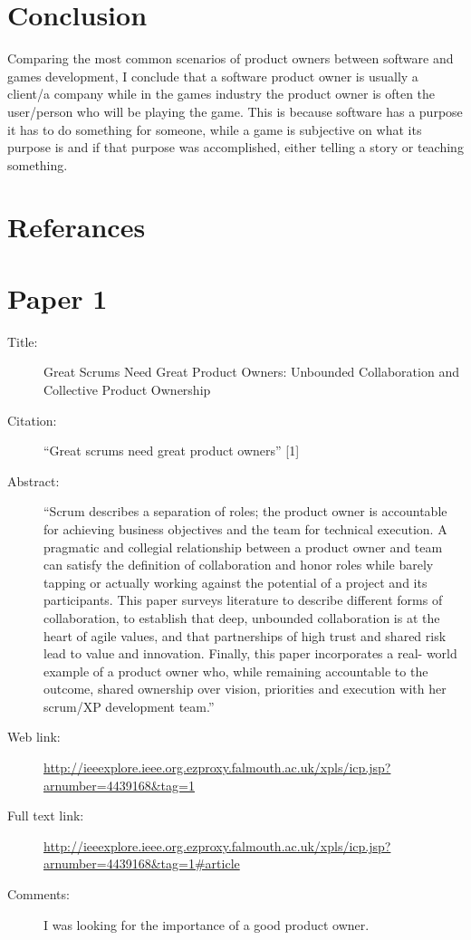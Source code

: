 \documentclass{scrartcl}
\begin{document}
\section{Conclusion}

Comparing the most common scenarios of product owners between software and games development, I conclude that a software product owner is usually a client/a company while in the games industry the product owner is often the user/person who will be playing the game. This is because software has a purpose it has to do something for someone, while a game is subjective on what its purpose is and if that purpose was accomplished, either telling a story or teaching something.






\section{Referances}
\section*{Paper 1}

\begin{description}
\item[Title:] Great Scrums Need Great Product Owners: Unbounded Collaboration  and Collective Product Ownership
\item[Citation:] “Great scrums need great product owners” [1]
\item[Abstract:] ``Scrum describes a separation of roles; the product owner is accountable for achieving business objectives and the team for technical execution. A pragmatic and collegial relationship between a product owner and team can satisfy the definition of collaboration and honor roles while barely tapping or actually working against the potential of a project and its participants. This paper surveys literature to describe different forms of collaboration, to establish that deep, unbounded collaboration is at the heart of agile values, and that partnerships of high trust and shared risk lead to value and innovation. Finally, this paper incorporates a real- world example of a product owner who, while remaining accountable to the outcome, shared ownership over vision, priorities and execution with her scrum/XP development team.''
\item[Web link:] \url{http://ieeexplore.ieee.org.ezproxy.falmouth.ac.uk/xpls/icp.jsp?arnumber=4439168&tag=1}
\item[Full text link:] \url{http://ieeexplore.ieee.org.ezproxy.falmouth.ac.uk/xpls/icp.jsp?arnumber=4439168&tag=1#article}
\item[Comments:] I was looking for the importance of a good product owner.
\end{description}
\end{document}

